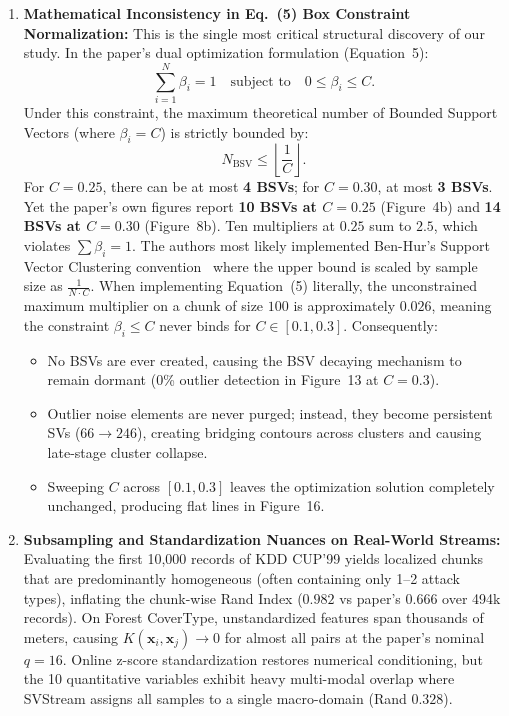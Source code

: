 \begin{enumerate}[label=\textbf{\arabic*.}]
  \item \textbf{Mathematical Inconsistency in Eq.~(5) Box Constraint Normalization:}
  This is the single most critical structural discovery of our study. In the paper's dual optimization formulation (Equation~5):
  \begin{equation}
    \sum_{i=1}^N \beta_i = 1 \quad \text{subject to} \quad 0 \le \beta_i \le C.
  \end{equation}
  Under this constraint, the maximum theoretical number of Bounded Support Vectors (where $\beta_i = C$) is strictly bounded by:
  \begin{equation}
    N_{\text{BSV}} \le \left\lfloor \frac{1}{C} \right\rfloor.
  \end{equation}
  For $C=0.25$, there can be at most \textbf{4 BSVs}; for $C=0.30$, at most \textbf{3 BSVs}. Yet the paper's own figures report \textbf{10 BSVs at $C=0.25$} (Figure~4b) and \textbf{14 BSVs at $C=0.30$} (Figure~8b). Ten multipliers at $0.25$ sum to $2.5$, which violates $\sum \beta_i = 1$. The authors most likely implemented Ben-Hur's Support Vector Clustering convention~\cite{wang2013svstream} where the upper bound is scaled by sample size as $\frac{1}{N \cdot C}$. When implementing Equation~(5) literally, the unconstrained maximum multiplier on a chunk of size $100$ is approximately $0.026$, meaning the constraint $\beta_i \le C$ never binds for $C \in [0.1, 0.3]$. Consequently:
  \begin{itemize}[leftmargin=1.2em,itemsep=1pt]
    \item No BSVs are ever created, causing the BSV decaying mechanism to remain dormant (0\% outlier detection in Figure~13 at $C=0.3$).
    \item Outlier noise elements are never purged; instead, they become persistent SVs ($66 \to 246$), creating bridging contours across clusters and causing late-stage cluster collapse.
    \item Sweeping $C$ across $[0.1, 0.3]$ leaves the optimization solution completely unchanged, producing flat lines in Figure~16.
  \end{itemize}

  \item \textbf{Subsampling and Standardization Nuances on Real-World Streams:}
  Evaluating the first 10,000 records of KDD CUP'99 yields localized chunks that are predominantly homogeneous (often containing only 1--2 attack types), inflating the chunk-wise Rand Index ($0.982$ vs paper's $0.666$ over 494k records). On Forest CoverType, unstandardized features span thousands of meters, causing $K(\mathbf{x}_i, \mathbf{x}_j) \to 0$ for almost all pairs at the paper's nominal $q=16$. Online z-score standardization restores numerical conditioning, but the 10 quantitative variables exhibit heavy multi-modal overlap where SVStream assigns all samples to a single macro-domain (Rand $0.328$).


\end{enumerate}
